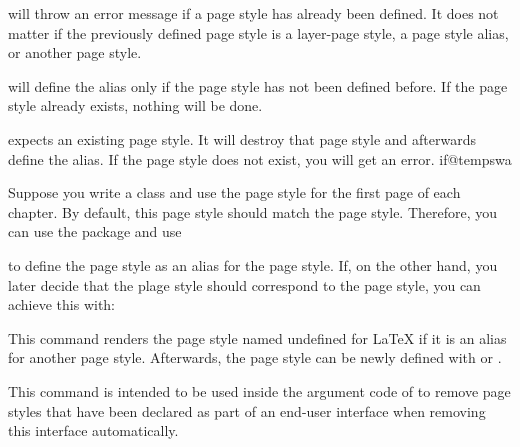  will throw an error message if a page style
 has already been defined. It does not matter if
the previously defined page style is a layer-page style, a page style alias,
or another page style.

 will define the alias only if the
 page style has not been defined before. If the
 page style already exists, nothing will be done.

 expects an existing
 page style. It will destroy that page style and
afterwards define the alias. If the  page style
does not exist, you will get an error.%
%
\csname if@tempswa\endcsname%
  \begin{Example}
    Suppose you write a class and use the  page style for the
    first page of each chapter. By default, this page style should match the
     page style. Therefore, you can use the 
    package and use
\begin{lstcode}
\end{lstcode}
    to define the  page style as an alias for the
     page style. If, on the other hand, you later decide that
    the  plage style should correspond to the
     page style, you can achieve this with:
\begin{lstcode}
\end{lstcode}%
  \end{Example}%
\fi
\EndIndexGroup


\begin{Declaration}
\end{Declaration}
%
%
This command renders the page style named  undefined
for \LaTeX{} if it is an alias for another page style. Afterwards, the page
style can be newly defined with
 or
. 

This command is intended to be used inside the argument code of
 to remove page styles
that have been declared as part of an end-user interface when removing this
interface automatically.%
\EndIndexGroup


